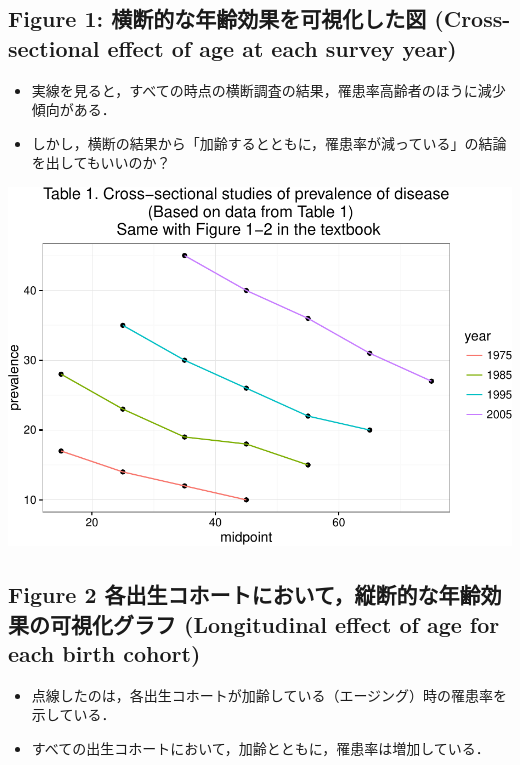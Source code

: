 \documentclass[11pt,]{article}
\providecommand{\tightlist}{%
  \setlength{\itemsep}{0pt}\setlength{\parskip}{0pt}}
\begin{document}
\subsection{Figure 1: 横断的な年齢効果を可視化した図 (Cross-sectional
effect of age at each survey
year)}\label{figure-1--cross-sectional-effect-of-age-at-each-survey-year}

\begin{itemize}
\tightlist
\item
  実線を見ると，すべての時点の横断調査の結果，罹患率高齢者のほうに減少傾向がある．
\item
  しかし，横断の結果から「加齢するとともに，罹患率が減っている」の結論を出してもいいのか？
\end{itemize}

\includegraphics{guidance_files/figure-latex/unnamed-chunk-3-1.pdf}

\subsection{Figure 2
各出生コホートにおいて，縦断的な年齢効果の可視化グラフ (Longitudinal
effect of age for each birth
cohort)}\label{figure-2--longitudinal-effect-of-age-for-each-birth-cohort}

\begin{itemize}
\tightlist
\item
  点線したのは，各出生コホートが加齢している（エージング）時の罹患率を示している．\\
\item
  すべての出生コホートにおいて，加齢とともに，罹患率は増加している．
\end{itemize}
\end{document}

